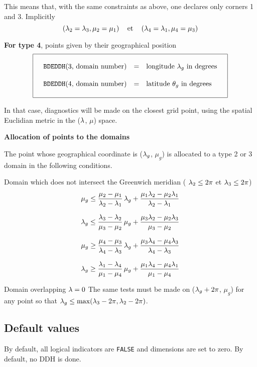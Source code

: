 This means that, with the same constraints as above, one declares only corners 1 and 3. Implicitly
$$ \lp \la_2 = \la_3 , \mu_2 = \mu_1 \rp \quad \hbox{et} \quad \lp \la_4 = \la_1 , \mu_4 = \mu_3 \rp $$

{\bf For type 4}, points given by their geographical position
$$ \bay{|rcl|} \hline & & \\
\quad \hbox{{\tt BDEDDH}(3, domain number)} &=& \hbox{longitude $\la_g$ in degrees} \quad \\[3ex]
\quad \hbox{{\tt BDEDDH}(4, domain number)} &=& \hbox{latitude $\ta_g$ in degrees} \quad \\[3ex]
\hline \eay $$

In that case, diagnostics will be made on the closest grid point, using the spatial Euclidian metric in the ($\la$, $\mu$) space. 

\ms
{\bf Allocation of points to the domains} 

The point whose geographical coordinate is ($\la_g$, $\mu_g$) is allocated to a type 2 or 3 domain in the following conditions.

\ms
\noi Domain which does not intersect the Greenwich meridian ( $\la_2 \leq 2\pi$ et $\la_3 \leq 2\pi$)
$$ \mu_g \leq \frac{\mu_2 - \mu_1}{\la_2 - \la_1} \, \la_g + \frac{\mu_1 \la_2 - \mu_2 \la_1}{\la_2 - \la_1} $$

$$ \la_g \leq \frac{\la_3 - \la_2}{\mu_3 - \mu_2} \, \mu_g + \frac{\mu_3 \la_2 - \mu_2 \la_3}{\mu_3 - 
\mu_2} $$

$$ \mu_g \geq \frac{\mu_4 - \mu_3}{\la_4 - \la_3} \, \la_g + \frac{\mu_3 \la_4 - \mu_4 \la_3}{\la_4 - 
\la_3} $$

$$ \la_g \geq \frac{\la_1 - \la_4}{\mu_1 - \mu_4} \, \mu_g + \frac{\mu_1 \la_4 - \mu_4 \la_1}{\mu_1 - 
\mu_4} $$

\ms
\noi Domain overlapping $\la=0$
The same tests must be made on ($\la_g+2\pi$, $\mu_g$) for any point so that $\la_g \leq \max ( \la_3-2\pi , \la_2-2\pi )$.

\ms

\subsection{Default values}

By default, all logical indicators are {\tt FALSE} and dimensions are set to zero. By default, no DDH is done. 


